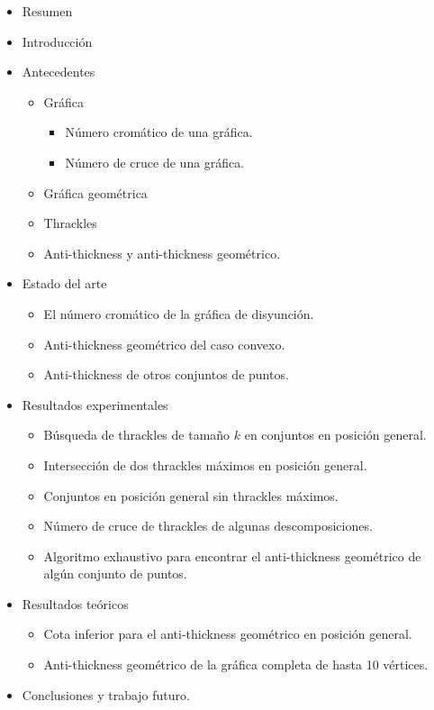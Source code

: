 \documentclass[12pt, letterpaper]{article}
\begin{document}
\begin{itemize}
  \item Resumen
  \item Introducción
  \item Antecedentes
    \begin{itemize}
      \item Gráfica
      \begin{itemize}
        \item Número cromático de una gráfica.
        \item Número de cruce de una gráfica.
      \end{itemize}
      \item Gráfica geométrica
      \item Thrackles
      \item Anti-thickness y anti-thickness geométrico.
    \end{itemize}
  \item Estado del arte
    \begin{itemize}
      \item El número cromático de la gráfica de disyunción.
      \item Anti-thickness geométrico del caso convexo.
      \item Anti-thickness de otros conjuntos de puntos.
    \end{itemize}
  \item Resultados experimentales
    \begin{itemize}
      \item Búsqueda de thrackles de tamaño $k$ en conjuntos en posición general.
      \item Intersección de dos thrackles máximos en posición general.
      \item Conjuntos en posición general sin thrackles máximos.
      \item Número de cruce de thrackles de algunas descomposiciones.
      \item Algoritmo exhaustivo para encontrar el anti-thickness geométrico de algún conjunto de puntos.
    \end{itemize}
  \item Resultados teóricos
    \begin{itemize}
      \item Cota inferior para el anti-thickness geométrico en posición general.
      \item Anti-thickness geométrico de la gráfica completa de hasta 10 vértices.
    \end{itemize}
  \item Conclusiones y trabajo futuro.
\end{itemize}
\end{document}
